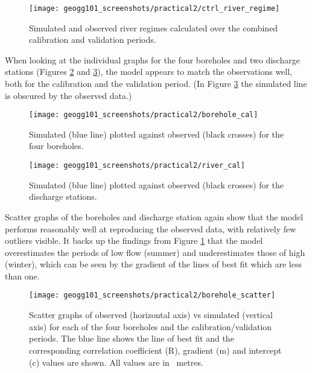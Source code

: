\documentclass{article}
\begin{document}
\begin{figure}[!h]
    \centering
    \texttt{[image: geogg101\_screenshots/practical2/ctrl\_river\_regime]}
    \caption{Simulated and observed river regimes calculated over the combined calibration and validation periods.}
    \label{fig:ctrl_river_regime}
\end{figure}


\newpage

When looking at the individual graphs for the four boreholes and two discharge stations (Figures \ref{fig:borehole_cal} and \ref{fig:river_cal}), the model appears to match the observations well, both for the calibration and the validation period. (In Figure \ref{fig:river_cal} the simulated line is obscured by the observed data.)

\begin{figure}[!h]
    \centering
    \texttt{[image: geogg101\_screenshots/practical2/borehole\_cal]}
    \caption{Simulated (blue line) plotted against observed (black crosses) for the four boreholes.}
    \label{fig:borehole_cal}
\end{figure}

\begin{figure}[!h]
    \centering
    \texttt{[image: geogg101\_screenshots/practical2/river\_cal]}
    \caption{Simulated (blue line) plotted against observed (black crosses) for the discharge stations.}
    \label{fig:river_cal}
\end{figure}


\newpage
Scatter graphs of the boreholes and discharge station again show that the model performs reasonably well at reproducing the observed data, with relatively few outliers visible. It backs up the findings from Figure \ref{fig:ctrl_river_regime} that the model overestimates the periods of low flow (summer) and underestimates those of high (winter), which can be seen by the gradient of the lines of best fit which are less than one.

\begin{figure}[!h]
    \centering
    \texttt{[image: geogg101\_screenshots/practical2/borehole\_scatter]}
    \caption{Scatter graphs of observed (horizontal axis) vs simulated (vertical axis) for each of the four boreholes and the calibration/validation periods. The blue line shows the line of best fit and the corresponding correlation coefficient (R), gradient (m) and intercept (c) values are shown. All values are in \SI{}{metres}.}
    \label{fig:borehole_scatter}
\end{figure}
\end{document}
